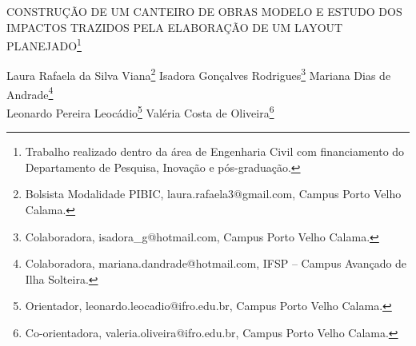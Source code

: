 \documentclass[article,12pt,onesidea,4paper,english,brazil]{abntex2}
\begin{document}
	
	
	\frenchspacing 
	
	\begin{center}
		\LARGE CONSTRUÇÃO DE UM CANTEIRO DE OBRAS MODELO E ESTUDO DOS
		IMPACTOS TRAZIDOS PELA ELABORAÇÃO DE UM LAYOUT PLANEJADO\footnote{Trabalho realizado dentro da área de Engenharia Civil com financiamento do Departamento de
			Pesquisa, Inovação e pós-graduação.}
		
		\normalsize
	Laura Rafaela da Silva Viana\footnote{Bolsista Modalidade PIBIC, laura.rafaela3@gmail.com, Campus Porto Velho Calama.} 
		Isadora Gonçalves Rodrigues\footnote{Colaboradora, isadora\_g@hotmail.com, Campus Porto Velho Calama.} 
	Mariana Dias de Andrade\footnote{Colaboradora, mariana.dandrade@hotmail.com, IFSP – Campus Avançado de Ilha Solteira.} \\
	Leonardo
	Pereira Leocádio\footnote{Orientador, leonardo.leocadio@ifro.edu.br, Campus Porto Velho Calama.} 
		Valéria Costa de Oliveira\footnote{Co-orientadora, valeria.oliveira@ifro.edu.br, Campus Porto Velho Calama.}
	\end{center}
	
\end{document}
